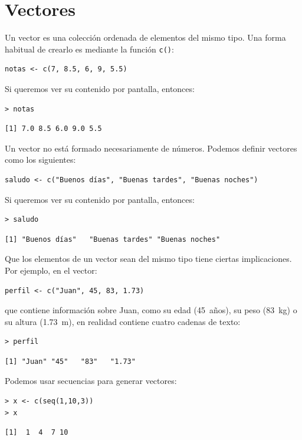 \documentclass[11pt,a4paper]{article}
\theoremstyle{exercise}
\begin{document}
\section{Vectores}

Un vector es una colección ordenada de elementos del mismo tipo. Una forma habitual de crearlo es mediante la función \texttt{c()}:
\begin{lstlisting}[style=rstyle]
notas <- c(7, 8.5, 6, 9, 5.5)
\end{lstlisting}
Si queremos ver su contenido por pantalla, entonces:
\begin{lstlisting}[style=rconsole]
> notas
\end{lstlisting}
\begin{lstlisting}[style=routput]
[1] 7.0 8.5 6.0 9.0 5.5
\end{lstlisting}


Un vector no está formado necesariamente de números. Podemos definir vectores como los siguientes:
\begin{lstlisting}[style=rstyle]
saludo <- c("Buenos días", "Buenas tardes", "Buenas noches")
\end{lstlisting}
Si queremos ver su contenido por pantalla, entonces:
\begin{lstlisting}[style=rconsole]
> saludo
\end{lstlisting}
\begin{lstlisting}[style=routput]
[1] "Buenos días"   "Buenas tardes" "Buenas noches"
\end{lstlisting}

Que los elementos de un vector sean del mismo tipo tiene ciertas implicaciones. Por ejemplo, en el vector:
\begin{lstlisting}[style=rstyle]
perfil <- c("Juan", 45, 83, 1.73)
\end{lstlisting}
que contiene información sobre Juan, como su edad (45~años), su peso (83~kg) o su altura (1.73~m), en realidad contiene cuatro cadenas de texto:
\begin{lstlisting}[style=rconsole]
> perfil
\end{lstlisting}
\begin{lstlisting}[style=routput]
[1] "Juan" "45"   "83"   "1.73"
\end{lstlisting}


Podemos usar secuencias para generar vectores:
\begin{lstlisting}[style=rconsole]
> x <- c(seq(1,10,3))
> x
\end{lstlisting}
\begin{lstlisting}[style=routput]
[1]  1  4  7 10
\end{lstlisting}
\end{document}
